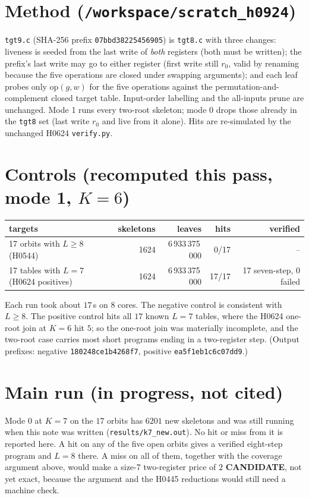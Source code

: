 \documentclass[11pt]{article}
\begin{document}
\section*{Method (\texttt{/workspace/scratch\_h0924})}
\texttt{tgt9.c} (SHA-256 prefix \texttt{07bbd38225456905}) is \texttt{tgt8.c} with three changes: liveness is seeded from the last write of \emph{both} registers (both must be written); the prefix's last write may go to either register (first write still $r_0$, valid by renaming because the five operations are closed under swapping arguments); and each leaf probes only $\mathrm{op}(g,w)$ for the five operations against the permutation-and-complement closed target table. Input-order labelling and the all-inputs prune are unchanged. Mode 1 runs every two-root skeleton; mode 0 drops those already in the \texttt{tgt8} set (last write $r_0$ and live from it alone). Hits are re-simulated by the unchanged H0624 \texttt{verify.py}.

\section*{Controls (recomputed this pass, mode 1, $K=6$)}
\begin{center}
\begin{tabular}{lrrrr}
targets & skeletons & leaves & hits & verified\\ \hline
17 orbits with $L\ge8$ (H0544) & 1624 & 6\,933\,375\,000 & 0/17 & --\\
17 tables with $L=7$ (H0624 positives) & 1624 & 6\,933\,375\,000 & 17/17 & 17 seven-step, 0 failed\\
\end{tabular}
\end{center}
Each run took about $17$\,s on $8$ cores. The negative control is consistent with $L\ge8$. The positive control hits all $17$ known $L=7$ tables, where the H0624 one-root join at $K=6$ hit $5$; so the one-root join was materially incomplete, and the two-root case carries most short programs ending in a two-register step. (Output prefixes: negative \texttt{180248ce1b4268f7}, positive \texttt{ea5f1eb1c6c07dd9}.)

\section*{Main run (in progress, not cited)}
Mode 0 at $K=7$ on the $17$ orbits has $6201$ new skeletons and was still running when this note was written (\texttt{results/k7\_new.out}). No hit or miss from it is reported here. A hit on any of the five open orbits gives a verified eight-step program and $L=8$ there. A miss on all of them, together with the coverage argument above, would make a size-7 two-register price of $2$ \textbf{CANDIDATE}, not yet exact, because the argument and the H0445 reductions would still need a machine check.
\end{document}
